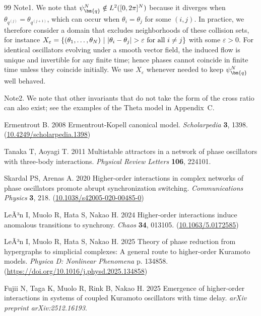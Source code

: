 \documentclass[
amsmath,amssymb,
]{revtex4-2}
\begin{document}
\begin{thebibliography}{99}
Note1.
We note that $\psi ^N_{\protect \bm {q}}\protect \notin L^2([0,2\pi ]^N)$ because it diverges when $\theta _{q^{(j)}}=\theta _{q^{(j+1)}}$, which can occur when $\theta _i = \theta _j$ for some $(i, j)$. In practice, we therefore consider a domain that excludes neighborhoods of these collision sets, for instance $X_\varepsilon = \left \{(\theta _1,\protect \ldots ,\theta _N)\ \middle |\ |\theta _i-\theta _j|>\varepsilon \ \protect \text {for all } i\protect \neq j \right \}$ with some $\varepsilon >0$. For identical oscillators evolving under a smooth vector field, the induced flow is unique and invertible for any finite time; hence phases cannot coincide in finite time unless they coincide initially. We use $X_\varepsilon $ whenever needed to keep $\psi _{\protect \bm {q}}^N$ well behaved.

Note2.
We note that other invariants that do not take the form of the cross ratio can also exist; see the examples of the Theta model in Appendix~C.

Ermentrout B. 2008  Ermentrout-Kopell canonical model. {\em Scholarpedia} \textbf{3}, 1398.
(\href{http://dx.doi.org/10.4249/scholarpedia.1398}{10.4249/scholarpedia.1398})

Tanaka T, Aoyagi T. 2011  Multistable attractors in a network of phase oscillators with three-body interactions. {\em Physical Review Letters} \textbf{106}, 224101.

Skardal PS, Arenas A. 2020  Higher-order interactions in complex networks of phase oscillators promote abrupt synchronization switching. {\em Communications Physics} \textbf{3}, 218.
(\href{http://dx.doi.org/10.1038/s42005-020-00485-0}{10.1038/s42005-020-00485-0})

Le^^c3^^b3n I, Muolo R, Hata S, Nakao H. 2024  Higher-order interactions induce anomalous transitions to synchrony. {\em Chaos} \textbf{34}, 013105.
(\href{http://dx.doi.org/10.1063/5.0172585}{10.1063/5.0172585})

Le^^c3^^b3n I, Muolo R, Hata S, Nakao H. 2025  Theory of phase reduction from hypergraphs to simplicial complexes: A general route to higher-order Kuramoto models. {\em Physica D: Nonlinear Phenomena} p. 134858.
(\href{http://dx.doi.org/https://doi.org/10.1016/j.physd.2025.134858}{https://doi.org/10.1016/j.physd.2025.134858})

Fujii N, Taga K, Muolo R, Rink B, Nakao H. 2025  Emergence of higher-order interactions in systems of coupled Kuramoto oscillators with time delay. {\em arXiv preprint arXiv:2512.16193}.

\end{thebibliography}
\end{document}
